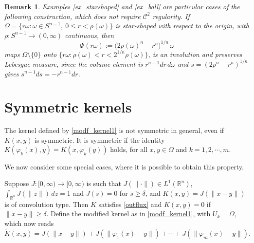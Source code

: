 \documentclass[a4paper,12pt]{amsart}
\newtheorem{rem}[theorem]{Remark}
\newcommand{\R}{\mathbb{R}}
\begin{document}
\begin{rem}
{Examples \ref{ex_starshaped} and \ref{ex_ball} are particular cases of the following construction, which does not require $\mathcal{C}^2$ regularity. If $\Omega = \{ r\omega : \omega \in S^{n-1},\ 0 \leq r < \rho(\omega)\}$ is star-shaped with respect to the origin, with $\rho : S^{n-1}\to(0,\infty)$ continuous, then
\[ \Phi(r\omega) := \big(2\rho(\omega)^n - r^n\big)^{1/n}\, \omega \]
maps $\Omega\setminus\{0\}$ onto $\{r\omega : \rho(\omega) < r < 2^{1/n}\rho(\omega)\}$, is an involution and preserves Lebesgue measure, since the volume element is $r^{n-1}dr\, d\omega$ and $s = (2\rho^n - r^n)^{1/n}$ gives $s^{n-1}ds = -r^{n-1}dr$.}
\end{rem}

  \section{Symmetric kernels}

   The kernel defined by \eqref{modf_kernel1} is not symmetric in general,  even if $K(x,y)$ is symmetric. {It is symmetric if} the identity $K(\varphi_k(x), y) = K(x, \varphi_k(y))$ holds, for all $x,y \in \Omega $ and  $k=1,2, \cdots, {m}$.

    We now consider some special cases, where it is possible to obtain this property.

    Suppose    $J: {[0,\infty)} \to {[0,\infty)}$ {is such that $J(\|\cdot\|) \in L^1(\R^n)$, $\int_{\R^n} J(\|z\|)\,dz = 1$ and $J(s) = 0$ for $s \geq \delta$}, and $K(x,y) = J(\|x-y\|)$ is of convolution type. {Then $K$ satisfies \eqref{outflux} and $K(x,y) = 0$ if $\|x-y\|\geq\delta$.} Define the modified kernel as in \eqref{modf_kernel1}, {with $U_k = \Omega$}, which now reads
   \begin{equation} \label{modf_kernel2}  \tilde{K}(x,y)  = J(\|x-y\|) +  J(\| \varphi_1(x)- y \|) + \cdots  +  J(\| \varphi_{{m}}(x)- y \|).
    \end{equation}
\end{document}
